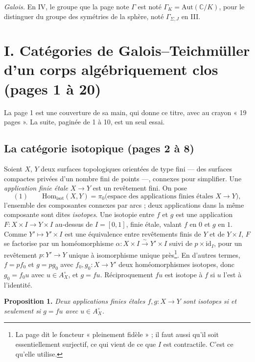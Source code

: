 \documentclass[11pt,a4paper]{article}
\begin{document}
\emph{Galois.} En IV, le groupe que la page note $\Gamma$ est noté
$\Gamma_K = \mathrm{Aut}(\mathbb{C}/K)$, pour le distinguer du groupe des
symétries de la sphère, noté $\Gamma_{\Sigma,J}$ en III.

\section*{I. Catégories de Galois–Teichmüller d'un corps algébriquement clos (pages 1 à 20)}

La page 1 est une couverture de sa main, qui donne ce titre, avec au crayon
« 19 pages ». La suite, paginée de 1 à 10, est un seul essai.

\subsection*{La catégorie isotopique (pages 2 à 8)}

Soient $X$, $Y$ deux surfaces topologiques orientées de type fini — des
surfaces compactes privées d'un nombre fini de points —, connexes pour
simplifier. Une \emph{application finie étale} $X \to Y$ est un revêtement
fini. On pose
\[
(1)\qquad \mathrm{Hom}_{\mathrm{isot}}(X, Y) = \pi_0\bigl(\text{espace des applications finies étales } X \to Y\bigr),
\]
l'ensemble des composantes connexes par arcs ; deux applications dans la même
composante sont dites \emph{isotopes}. Une isotopie entre $f$ et $g$ est une
application $F : X \times I \to Y \times I$ au-dessus de $I = [0,1]$, finie
étale, valant $f$ en $0$ et $g$ en $1$. Comme $Y' \mapsto Y' \times I$ est
une équivalence entre revêtements finis de $Y$ et de $Y \times I$, $F$ se
factorise par un homéomorphisme $\alpha : X \times I \xrightarrow{\sim} Y'
\times I$ suivi de $p \times \mathrm{id}_I$, pour un revêtement $p : Y' \to Y$
unique à isomorphisme unique près\footnote{La page dit le foncteur
« pleinement fidèle » ; il faut aussi qu'il soit essentiellement surjectif, ce
qui vient de ce que $I$ est contractile. C'est ce qu'elle utilise.}. En
d'autres termes, $f = p f_0$ et $g = p g_0$ avec $f_0, g_0 : X \to Y'$ deux
homéomorphismes isotopes, donc $g_0 = f_0 u$ avec $u \in A^{\circ}_X$, et
$g = f u$. Réciproquement $f u$ est isotope à $f$ si $u$ l'est à l'identité.

\textbf{Proposition 1.} \emph{Deux applications finies étales $f, g : X \to Y$
sont isotopes si et seulement si $g = f u$ avec $u \in A^{\circ}_X$.}
\end{document}
